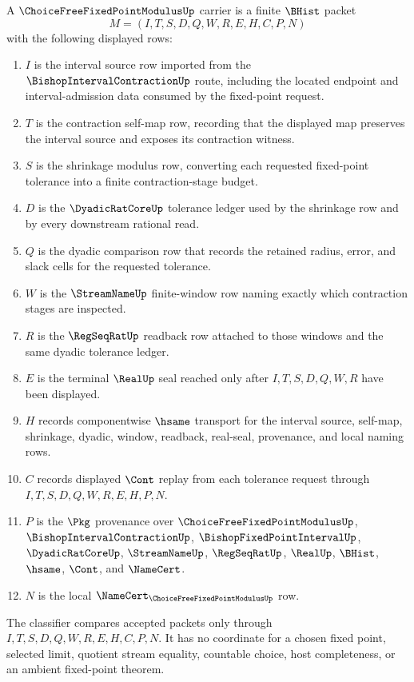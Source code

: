 \begin{definition}
\label{def:choice-free-fixed-point-modulus-carrier}
A $\ChoiceFreeFixedPointModulusUp$ carrier is a finite $\BHist$ packet
$$
M=(I,T,S,D,Q,W,R,E,H,C,P,N)
$$
with the following displayed rows:
\begin{enumerate}
\item $I$ is the interval source row imported from the $\BishopIntervalContractionUp$ route, including the located endpoint and interval-admission data consumed by the fixed-point request.
\item $T$ is the contraction self-map row, recording that the displayed map preserves the interval source and exposes its contraction witness.
\item $S$ is the shrinkage modulus row, converting each requested fixed-point tolerance into a finite contraction-stage budget.
\item $D$ is the $\DyadicRatCoreUp$ tolerance ledger used by the shrinkage row and by every downstream rational read.
\item $Q$ is the dyadic comparison row that records the retained radius, error, and slack cells for the requested tolerance.
\item $W$ is the $\StreamNameUp$ finite-window row naming exactly which contraction stages are inspected.
\item $R$ is the $\RegSeqRatUp$ readback row attached to those windows and the same dyadic tolerance ledger.
\item $E$ is the terminal $\RealUp$ seal reached only after $I,T,S,D,Q,W,R$ have been displayed.
\item $H$ records componentwise $\hsame$ transport for the interval source, self-map, shrinkage, dyadic, window, readback, real-seal, provenance, and local naming rows.
\item $C$ records displayed $\Cont$ replay from each tolerance request through $I,T,S,D,Q,W,R,E,H,P,N$.
\item $P$ is the $\Pkg$ provenance over $\ChoiceFreeFixedPointModulusUp$, $\BishopIntervalContractionUp$, $\BishopFixedPointIntervalUp$, $\DyadicRatCoreUp$, $\StreamNameUp$, $\RegSeqRatUp$, $\RealUp$, $\BHist$, $\hsame$, $\Cont$, and $\NameCert$.
\item $N$ is the local $\NameCert_{\ChoiceFreeFixedPointModulusUp}$ row.
\end{enumerate}
The classifier compares accepted packets only through $I,T,S,D,Q,W,R,E,H,C,P,N$. It has no coordinate for a chosen fixed point, selected limit, quotient stream equality, countable choice, host completeness, or an ambient fixed-point theorem.
\end{definition}

